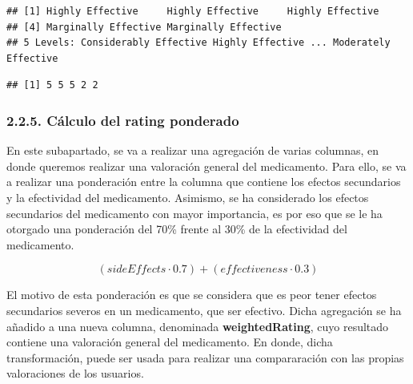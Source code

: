 \documentclass[spanish,]{article}
\newenvironment{Shaded}{\begin{snugshade}}{\end{snugshade}}
\newcommand{\KeywordTok}[1]{\textcolor[rgb]{0.13,0.29,0.53}{\textbf{#1}}}
\newcommand{\DecValTok}[1]{\textcolor[rgb]{0.00,0.00,0.81}{#1}}
\newcommand{\OperatorTok}[1]{\textcolor[rgb]{0.81,0.36,0.00}{\textbf{#1}}}
\newcommand{\NormalTok}[1]{#1}
\begin{document}
\begin{verbatim}
## [1] Highly Effective     Highly Effective     Highly Effective    
## [4] Marginally Effective Marginally Effective
## 5 Levels: Considerably Effective Highly Effective ... Moderately Effective
\end{verbatim}

\begin{Shaded}
\end{Shaded}

\begin{verbatim}
## [1] 5 5 5 2 2
\end{verbatim}

\subsubsection{2.2.5. Cálculo del rating
ponderado}\label{calculo-del-rating-ponderado}

En este subapartado, se va a realizar una agregación de varias columnas,
en donde queremos realizar una valoración general del medicamento. Para
ello, se va a realizar una ponderación entre la columna que contiene los
efectos secundarios y la efectividad del medicamento. Asimismo, se ha
considerado los efectos secundarios del medicamento con mayor
importancia, es por eso que se le ha otorgado una ponderación del 70\%
frente al 30\% de la efectividad del medicamento.

\[( sideEffects \cdot 0.7 ) + ( effectiveness \cdot 0.3 )\]

El motivo de esta ponderación es que se considera que es peor tener
efectos secundarios severos en un medicamento, que ser efectivo. Dicha
agregación se ha añadido a una nueva columna, denominada
\textbf{weightedRating}, cuyo resultado contiene una valoración general
del medicamento. En donde, dicha transformación, puede ser usada para
realizar una compararación con las propias valoraciones de los usuarios.
\end{document}
